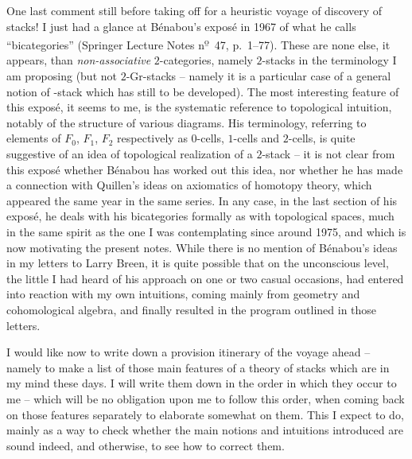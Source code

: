 One last comment still before taking off for a heuristic voyage of
discovery of stacks! I just had a glance at Bénabou's exposé in
1967 of what he calls ``bicategories'' (Springer Lecture Notes
n\textsuperscript{\b o}~47, p.~1--77). These are none else, it appears,
than \emph{non-associative} $2$-categories, namely $2$-stacks in the
terminology I am proposing (but not $2$-Gr-stacks -- namely it is a
particular case of a general notion of \oo-stack which has still to be
developed). The most interesting feature of this expos\'e, it seems to
me, is the systematic reference to topological intuition, notably of
the structure of various diagrams. His terminology, referring to
elements of $F_0$, $F_1$, $F_2$ respectively as $0$-cells, $1$-cells
and $2$-cells, is quite suggestive of an idea of topological
realization of a $2$-stack -- it is not clear from this expos\'e
whether B\'enabou has worked out this idea, nor whether he has made a
connection with Quillen's ideas on axiomatics of homotopy theory,
which appeared the same year in the same series. In any case, in the
last section of his expos\'e, he deals with his bicategories formally
as with topological spaces, much in the same spirit as the one I was
contemplating since around 1975, and which is now motivating the
present notes. While there is no mention of B\'enabou's ideas in my
letters to Larry Breen, it is quite possible that on the unconscious
level, the little I had heard of his approach on one or two casual
occasions, had entered into reaction with my own intuitions, coming
mainly from geometry and cohomological algebra, and finally resulted
in the program outlined in those letters.

\label{sec:19}%
I would like now to write down a provision itinerary of
the voyage ahead -- namely to make a list of those main features of a
theory of stacks which are in my mind these days. I will write them
down in the order in which they occur to me -- which will be no
obligation upon me to follow this order, when coming back on those
features separately to elaborate somewhat on them. This I expect to
do, mainly as a way to check whether the main notions and intuitions
introduced are sound indeed, and otherwise, to see how to correct
them.

